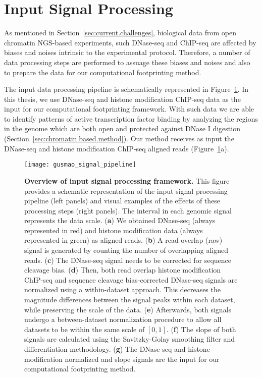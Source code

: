 \section{Input Signal Processing}
\label{sec:input.signal.processing}

As mentioned in Section~\ref{sec:current.challenges}, biological data from open chromatin NGS-based experiments, such DNase-seq and ChIP-seq are affected by biases and noises intrinsic to the experimental protocol. Therefore, a number of data processing steps are performed to assuage these biases and noises and also to prepare the data for our computational footprinting method.

The input data processing pipeline is schematically represented in Figure~\ref{fig:gusmao_signal_pipeline}. In this thesis, we use DNase-seq and histone modification ChIP-seq data as the input for our computational footprinting framework. With such data we are able to identify patterns of active transcription factor binding by analyzing the regions in the genome which are both open and protected against DNase I digestion (Section~\ref{sec:chromatin.based.method}). Our method receives as input the DNase-seq and histone modification ChIP-seq aligned reads (Figure~\ref{fig:gusmao_signal_pipeline}a).

\begin{figure}[h!]
\centering
\vspace{1.2cm}
\texttt{[image: gusmao\_signal\_pipeline]}
\vspace{0.1cm}
\caption[Overview of input signal processing framework]{\textbf{Overview of input signal processing framework.} This figure provides a schematic representation of the input signal processing pipeline (left panels) and visual examples of the effects of these processing steps (right panels). The interval in each genomic signal represents the data scale. (\textbf{a}) We obtained DNase-seq (always represented in red) and histone modification data (always represented in green) as aligned reads. (\textbf{b}) A read overlap (raw) signal is generated by counting the number of overlapping aligned reads. (\textbf{c}) The DNase-seq signal needs to be corrected for sequence cleavage bias. (\textbf{d}) Then, both read overlap histone modification ChIP-seq and sequence cleavage bias-corrected DNase-seq signals are normalized using a within-dataset approach. This decreases the magnitude differences between the signal peaks within each dataset, while preserving the scale of the data. (\textbf{e}) Afterwards, both signals undergo a between-dataset normalization procedure to allow all datasets to be within the same scale of $[0, 1]$. (\textbf{f}) The slope of both signals are calculated using the Savitzky-Golay smoothing filter and differentiation methodology. (\textbf{g}) The DNase-seq and histone modification normalized and slope signals are the input for our computational footprinting method.}
\label{fig:gusmao_signal_pipeline}
\end{figure}

